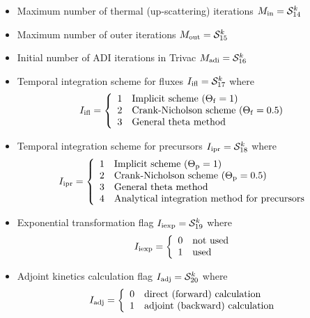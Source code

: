 \begin{itemize}
\item Maximum number of thermal (up-scattering) iterations $M_{\rm in}=\mathcal{S}^{k}_{14}$

\item Maximum number of outer iterations $M_{\rm out}=\mathcal{S}^{k}_{15}$

\item Initial number of ADI iterations in Trivac $M_{\rm adi}=\mathcal{S}^{k}_{16}$

\item Temporal integration scheme for fluxes $I_{\rm ifl}=\mathcal{S}^{k}_{17}$ where
\begin{displaymath}
I_{\rm ifl} = \left\{
\begin{array}{rl}
 1 & \textrm{Implicit scheme ($\Theta_{\rm f}=1$)} \\
 2 & \textrm{Crank-Nicholson scheme ($\Theta_{\rm f}=0.5$)} \\
 3 & \textrm{General theta method}
\end{array} \right.
\end{displaymath}

\item Temporal integration scheme for precursors $I_{\rm ipr}=\mathcal{S}^{k}_{18}$ where
\begin{displaymath}
I_{\rm ipr} = \left\{
\begin{array}{rl}
 1 & \textrm{Implicit scheme ($\Theta_{\rm p}=1$)} \\
 2 & \textrm{Crank-Nicholson scheme ($\Theta_{\rm p}=0.5$)} \\
 3 & \textrm{General theta method} \\
 4 & \textrm{Analytical integration method for precursors}
\end{array} \right.
\end{displaymath}

\item Exponential transformation flag $I_{\rm iexp}=\mathcal{S}^{k}_{19}$ where
\begin{displaymath}
I_{\rm iexp} = \left\{
\begin{array}{rl}
 0 & \textrm{not used} \\
 1 & \textrm{used}
\end{array} \right.
\end{displaymath}

\item Adjoint kinetics calculation flag $I_{\rm adj}=\mathcal{S}^{k}_{20}$ where
\begin{displaymath}
I_{\rm adj} = \left\{
\begin{array}{rl}
 0 & \textrm{direct (forward) calculation} \\
 1 & \textrm{adjoint (backward) calculation}
\end{array} \right.
\end{displaymath}

\end{itemize}
\goodbreak

